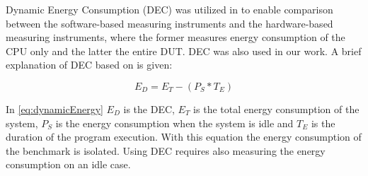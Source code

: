 Dynamic Energy Consumption (DEC) was utilized in \cite{fahad2019comparative,biksbois} to enable comparison between the software-based measuring instruments and the hardware-based measuring instruments, where the former measures energy consumption of the CPU only and the latter the entire DUT. DEC was also used in our work. A brief explanation of DEC based on \cite{fahad2019comparative} is given:

\begin{equation}\label{eq:dynamicEnergy}
    E_D = E_T - (P_S * T_E)
\end{equation}

In \cref{eq:dynamicEnergy} $E_D$ is the DEC, $E_T$ is the total energy consumption of the system, $P_S$ is the energy consumption when the system is idle and $T_E$ is the duration of the program execution. With this equation the energy consumption of the benchmark is isolated. Using DEC requires also measuring the energy consumption on an idle case. \cite{fahad2019comparative}
